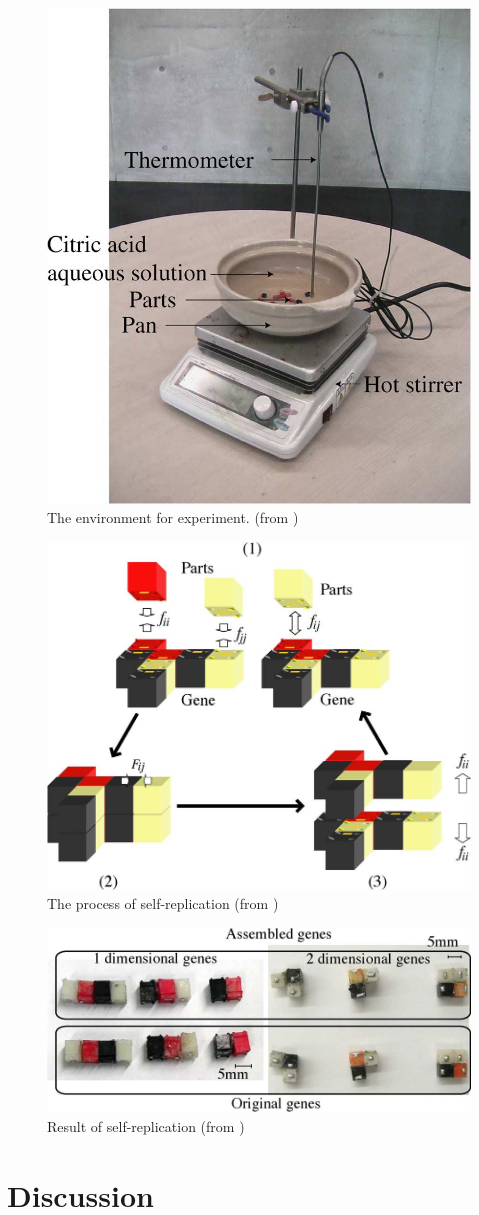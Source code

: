 \documentclass[12pt,twoside]{article}
\theoremstyle{plain}
\theoremstyle{definition}
\theoremstyle{remark}
\begin{document}
\begin{figure}[h]
	 \centerline{\includegraphics[width=.55\textwidth]{matsu-003}}
	 {\caption{The environment for experiment. (from \cite{matsumoto_passive_2009})}
	 \label{fig:matsu-env}}
\end{figure}

\begin{figure}[h]
	 \centerline{\includegraphics[width=.5\textwidth]{matsu-000}}
	 {\caption{The process of self-replication (from \cite{matsumoto_passive_2009})}
	 \label{fig:matsu-modes}}
\end{figure}

\begin{figure}[h]
	 \centerline{\includegraphics[width=.7\textwidth]{matsu-019}}
	 {\caption{Result of self-replication (from \cite{matsumoto_passive_2009})}
	 \label{fig:matsu-res}}
\end{figure}

\section{Discussion}
\label{sec:discuss}


%
%



\end{document}
